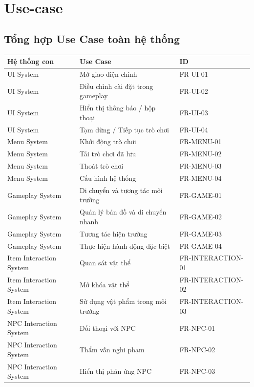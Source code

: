 \section{Use-case}

\subsection{Tổng hợp Use Case toàn hệ thống}

\begin{longtable}{|p{5cm}|p{6cm}|p{4.5cm}|}
\hline
\textbf{Hệ thống con} & \textbf{Use Case} & \textbf{ID} \\ \hline

UI System & Mở giao diện chính & FR-UI-01 \\ 
UI System & Điều chỉnh cài đặt trong gameplay & FR-UI-02 \\ 
UI System & Hiển thị thông báo / hộp thoại & FR-UI-03 \\ 
UI System & Tạm dừng / Tiếp tục trò chơi & FR-UI-04 \\ \hline

Menu System & Khởi động trò chơi & FR-MENU-01 \\ 
Menu System & Tải trò chơi đã lưu & FR-MENU-02 \\ 
Menu System & Thoát trò chơi & FR-MENU-03 \\ 
Menu System & Cấu hình hệ thống & FR-MENU-04 \\ \hline

Gameplay System & Di chuyển và tương tác môi trường & FR-GAME-01 \\ 
Gameplay System & Quản lý bản đồ và di chuyển nhanh & FR-GAME-02 \\ 
Gameplay System & Tương tác hiện trường & FR-GAME-03 \\ 
Gameplay System & Thực hiện hành động đặc biệt & FR-GAME-04 \\ \hline

Item Interaction System & Quan sát vật thể & FR-INTERACTION-01 \\ 
Item Interaction System & Mở khóa vật thể & FR-INTERACTION-02 \\ 
Item Interaction System & Sử dụng vật phẩm trong môi trường & FR-INTERACTION-03 \\ \hline

NPC Interaction System & Đối thoại với NPC & FR-NPC-01 \\ 
NPC Interaction System & Thẩm vấn nghi phạm & FR-NPC-02 \\ 
NPC Interaction System & Hiển thị phản ứng NPC & FR-NPC-03 \\ \hline


\end{longtable}
